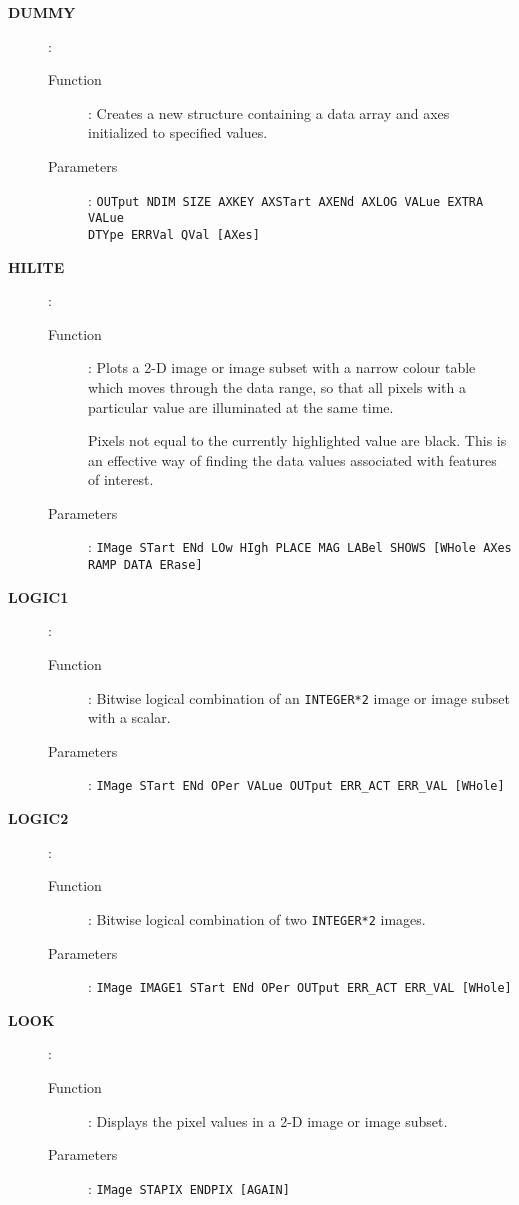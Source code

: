 \begin{description}
\newpage

\item[\large\bf DUMMY]:
   \begin{description}
   \item[Function]: 
      Creates a new structure containing a data array and axes initialized to
         specified values.
   \item[Parameters]: 
      {\tt OUTput NDIM SIZE AXKEY AXSTart AXENd AXLOG VALue EXTRA VALue\\
      DTYpe ERRVal QVal [AXes]} 
   \end{description}

\item[\large\bf HILITE]:
   \begin{description}
   \item[Function]: 
      Plots a 2-D image or image subset with a narrow colour table which moves
      through the data range, so that all pixels with a particular value are 
      illuminated at the same time. 

      Pixels not equal to the currently highlighted value are black. This is
      an effective way of finding the data values associated with features of
      interest.
   \item[Parameters]: 
      {\tt IMage STart ENd LOw HIgh PLACE MAG LABel SHOWS [WHole AXes\\
      RAMP DATA ERase]}
   \end{description}

\item[\large\bf LOGIC1]:
   \begin{description}
   \item[Function]: 
      Bitwise logical combination of an {\tt INTEGER*2} image or image subset
      with a scalar.
   \item[Parameters]: 
      {\tt IMage STart ENd OPer VALue OUTput ERR\_ACT ERR\_VAL [WHole]}
   \end{description}

\item[\large\bf LOGIC2]:
   \begin{description}
   \item[Function]: 
      Bitwise logical combination of two {\tt INTEGER*2} images.
   \item[Parameters]: 
      {\tt IMage IMAGE1 STart ENd OPer OUTput ERR\_ACT ERR\_VAL [WHole]}
   \end{description}

\item[\large\bf LOOK]:
   \begin{description}
   \item[Function]: 
      Displays the pixel values in a 2-D image or image subset.
   \item[Parameters]: 
      {\tt IMage STAPIX ENDPIX [AGAIN]}
   \end{description}


\end{description}
